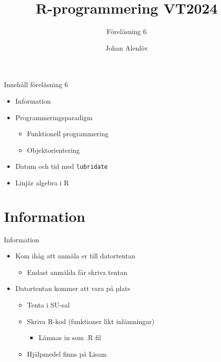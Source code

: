 \documentclass[
  11pt,
  ignorenonframetext,
  handout]{beamer}
\title{R-programmering VT2024}
\subtitle{Föreläsning 6}
\author{Johan Alenlöv}
\date{}
\institute{Linköpings Universitet}
\providecommand{\tightlist}{%
  \setlength{\itemsep}{0pt}\setlength{\parskip}{0pt}}
\begin{document}
\frame{\titlepage}

\begin{frame}{Innehåll föreläsning 6}
\label{innehuxe5ll-fuxf6reluxe4sning-6}
\begin{itemize}
\tightlist
\item
  Information
\item
  Programmeringsparadigm

  \begin{itemize}
  \tightlist
  \item
    Funktionell programmering
  \item
    Objektorientering
  \end{itemize}
\item
  Datum och tid med \texttt{lubridate}
\item
  Linjär algebra i R
\end{itemize}
\end{frame}

\section{Information}\label{information}

\begin{frame}{Information}
\label{information-1}
\begin{itemize}
\tightlist
\item
  Kom ihåg att anmäla er till datortentan

  \begin{itemize}
  \tightlist
  \item
    Endast anmälda får skriva tentan
  \end{itemize}
\item
  Datortentan kommer att vara på plats

  \begin{itemize}
  \tightlist
  \item
    Tenta i SU-sal
  \item
    Skriva R-kod (funktioner likt inlämningar)

    \begin{itemize}
    \tightlist
    \item
      Lämnas in som .R fil
    \end{itemize}
  \item
    Hjälpmedel finns på Lisam
  \end{itemize}
\end{itemize}
\end{frame}
\end{document}
